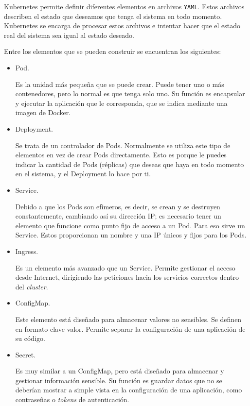 Kubernetes permite definir diferentes elementos en archivos \texttt{YAML}. Estos archivos describen el estado que deseamos que tenga el sistema en todo momento. Kubernetes se encarga de procesar estos archivos e intentar hacer que el estado real del sistema sea igual al estado deseado.

Entre los elementos que se pueden construir se encuentran los siguientes:

\begin{itemize}
  \item Pod.

    Es la unidad más pequeña que se puede crear. Puede tener uno o más contenedores, pero lo normal es que tenga solo uno. Su función es encapsular y ejecutar la aplicación que le corresponda, que se indica mediante una imagen de Docker.
  \item Deployment.

    Se trata de un controlador de Pods. Normalmente se utiliza este tipo de elementos en vez de crear Pods directamente. Esto es porque le puedes indicar la cantidad de Pods (réplicas) que deseas que haya en todo momento en el sistema, y el Deployment lo hace por ti.
  \item Service.

    Debido a que los Pods son efímeros, es decir, se crean y se destruyen constantemente, cambiando así su dirección IP; es necesario tener un elemento que funcione como punto fijo de acceso a un Pod. Para eso sirve un Service. Estos proporcionan un nombre y una IP únicos y fijos para los Pods.
  \item Ingress.

    Es un elemento más avanzado que un Service. Permite gestionar el acceso desde Internet, dirigiendo las peticiones hacia los servicios correctos dentro del \textit{cluster}.

  \item ConfigMap.

    Este elemento está diseñado para almacenar valores no sensibles. Se definen en formato clave-valor. Permite separar la configuración de una aplicación de su código.

  \item Secret.

    Es muy similar a un ConfigMap, pero está diseñado para almacenar y gestionar información sensible. Su función es guardar datos que no se deberían mostrar a simple vista en la configuración de una aplicación, como contraseñas o \textit{tokens} de autenticación.
\end{itemize}

